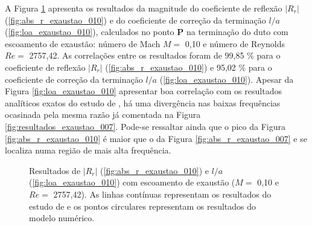 A Figura \ref{fig:resultados_exaustao_010} apresenta os resultados da magnitude do coeficiente de reflexão $|R_{r}|$ (\ref{fig:abs_r_exaustao_010}) e do coeficiente de correção da terminação $l/a$ (\ref{fig:loa_exaustao_010}), calculados no ponto $\textbf{P}$ na terminação do duto com escoamento de exaustão: número de Mach $M =$ 0,10 e número de Reynolds $Re =$ 2757,42.  As correlações entre os resultados foram de 99,85 \% para o coeficiente de reflexão $|R_{r}|$ (\ref{fig:abs_r_exaustao_010}) e 95,02 \% para o coeficiente de correção da terminação $l/a$ (\ref{fig:loa_exaustao_010}). Apesar da Figura \ref{fig:loa_exaustao_010} apresentar boa correlação com os resultados analíticos exatos do estudo de , há uma divergência nas baixas frequências ocasinada pela mesma razão já comentada na Figura \ref{fig:resultados_exaustao_007}. Pode-se ressaltar ainda que o pico da Figura \ref{fig:abs_r_exaustao_010} é maior que o da Figura \ref{fig:abs_r_exaustao_007} e se localiza numa região de mais alta frequência.

\begin{figure}[ht!]
\begin{subfigure}{\scaleA \textwidth}
  
\end{subfigure}%
\begin{subfigure}{\scaleA \textwidth}
  
\end{subfigure}
\caption[Resultados de $|R_{r}|$ e $l/a$ com escoamento de exaustão ($M =$ 0,10 e $Re =$ 2757,42)]{Resultados de $|R_{r}|$ (\ref{fig:abs_r_exaustao_010}) e $l/a$ (\ref{fig:loa_exaustao_010}) com escoamento de exaustão ($M =$ 0,10 e $Re =$ 2757,42). As linhas contínuas representam os resultados do estudo de  e os pontos circulares representam os resultados do modelo numérico.}
\label{fig:resultados_exaustao_010}
\end{figure}

